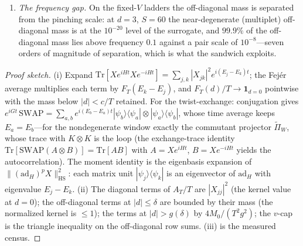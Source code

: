 \begin{proposition}
\begin{enumerate}[leftmargin=1.6em]
\begin{equation*}
\frac{A_T}{T}-m(\delta)-\frac{4M_0}{T^{2}g(\delta)^{2}}
\;\le\;\sum_{j\in W}a_j^{2}\;\le\;\frac{A_T}{T},
\end{equation*}
the tail term from $F_T(d)/T\le\min\{1,\,4/(T^{2}d^{2})\}$ for $d\neq0$;
and the near-diagonal mass is capped a priori by the quantum variances,
$|X_{jk}|^{2}\le\sum_{m\neq j}|X_{mj}|^{2}=\langle\psi_j|K^{2}|\psi_j
\rangle-a_j^{2}$, so $m(\delta)$ is bounded by censused
intra-eigenstate variances.
\item \emph{The frequency gap.} On the fixed-$V$ ladders the off-diagonal
mass is separated from the pinching scale: at $d=3$, $S=60$ the
near-degenerate (multiplet) off-diagonal mass is at the $10^{-20}$ level
of the surrogate, and $99.9\%$ of the off-diagonal mass lies above
frequency $0.1$ against a pair scale of $10^{-8}$---seven orders of
magnitude of separation, which is what the sandwich exploits.
\end{enumerate}
\end{proposition}

\begin{proof}[Proof sketch]
(i) Expand $\mathrm{Tr}[Xe^{iHt}Xe^{-iHt}]=\sum_{j,k}|X_{jk}|^{2}
e^{i(E_j-E_k)t}$; the Fej\'er average multiplies each term by
$F_T(E_k-E_j)$, and $F_T(d)/T\to\mathbf{1}_{d=0}$ pointwise with the
mass below $|d|<c/T$ retained.  For the twist-exchange: conjugation gives
$e^{iGt}\,\mathrm{SWAP}=\sum_{a,b}e^{i(E_b-E_a)t}|\psi_b\rangle\langle
\psi_a|\otimes|\psi_a\rangle\langle\psi_b|$, whose time average keeps
$E_a=E_b$---for the nondegenerate window exactly the commutant projector
$\widetilde{\Pi}_W$, whose trace with $K\otimes K$ is the loop (the
exchange-trace identity $\mathrm{Tr}[\mathrm{SWAP}(A\otimes B)]=
\mathrm{Tr}[AB]$ with $A=Xe^{iHt}$, $B=Xe^{-iHt}$ yields the
autocorrelation).  The moment identity is the eigenbasis expansion of
$\|(\mathrm{ad}_H)^pX\|^2_{\mathrm{HS}}$: each matrix unit
$|\psi_j\rangle\langle\psi_k|$ is an eigenvector of $\mathrm{ad}_H$ with
eigenvalue $E_j-E_k$.  (ii) The diagonal terms of $A_T/T$ are
$|X_{jj}|^{2}$ (the kernel value at $d=0$); the off-diagonal terms at
$|d|\le\delta$ are bounded by their mass (the normalized kernel is
$\le1$); the terms at $|d|>g(\delta)$ by $4M_0/(T^{2}g^{2})$; the
$v$-cap is the triangle inequality on the off-diagonal row sums.  (iii)
is the measured census.
\end{proof}

